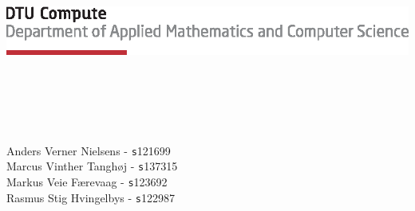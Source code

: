 
\begin{titlepage}
\null
\vfill
\includegraphics[scale=1]{figures/tex_dtu_compute_a_uk}\\[20pt]
\addtolength{\wpXoffset}{-6cm}
\addtolength{\wpYoffset}{-10cm}

{\huge\bfseries \COURSE}\\\ \\
{\LARGE\bfseries \TITLE}\\\ \\
{\DATE}

\vspace{140pt}

Anders Verner Nielsens - {\texttt s121699}\\
Marcus Vinther Tanghøj - {\texttt s137315}\\
Markus Veie Færevaag - {\texttt s123692}\\
Rasmus Stig Hvingelbys - {\texttt s122987} \\
\\
[7cm]
\end{titlepage}

\newpage
